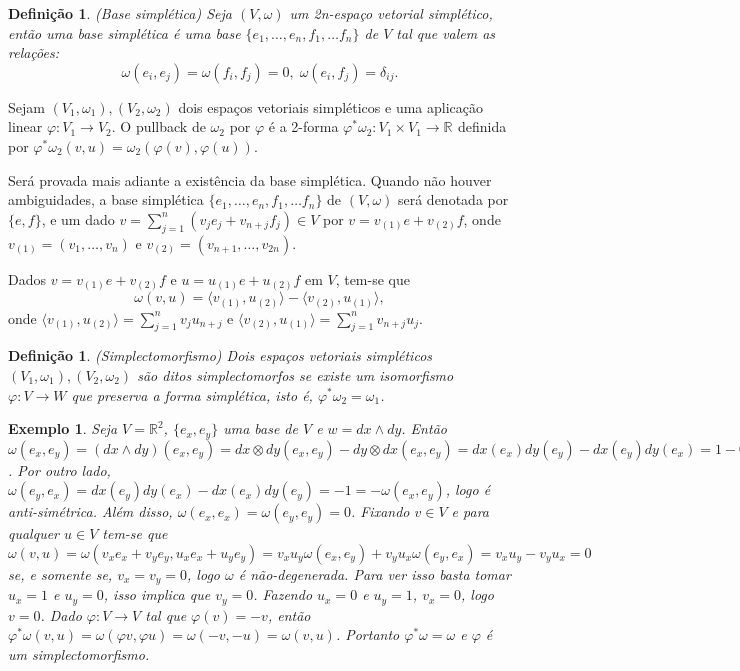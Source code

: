 \documentclass[12pt]{book}
\newtheorem{definicao}[teorema]{Definição}
\newtheorem{exemplo}[teorema]{Exemplo}
\newcommand{\formaSimpletica}[2]{\omega(#1, #2)}
\newcommand{\produtointerno}[2]{\langle #1, #2 \rangle}
\newcommand{\real}[1]{\mathbb{R}^{#1}}
\newcommand{\reta}{\real{}}
\begin{document}
	\begin{definicao}
		(Base simplética) Seja $(V, \omega)$ um 2n-espaço vetorial simplético, então uma base simplética é uma base $\{ e_{1},\dots, e_{n},f_{1},\dots f_{n}\}$ de $V$ tal que valem as relações:
		$$
		\omega(e_{i}, e_{j}) = \omega(f_{i}, f_{j}) = 0, \; \omega(e_{i}, f_{j}) = \delta_{ij}.
		$$
	\end{definicao}
	
	Sejam $(V_{1}, \omega_{1}), (V_{2}, \omega_{2})$ dois espaços vetoriais simpléticos e uma aplicação linear $\varphi: V_{1}\to V_{2}$. O pullback de $\omega_{2}$ por $\varphi$ é a 2-forma $\varphi^{*}\omega_{2}:V_{1} \times V_{1} \to \reta$ definida por $\varphi^{*}\omega_{2}(v,u) = \omega_{2}(\varphi(v), \varphi(u))$.
	
	Será provada mais adiante a existência da base simplética. \label{convensao_base_simpletica} Quando não houver ambiguidades, a base simplética  $\{ e_{1},\dots, e_{n},f_{1},\dots f_{n}\}$  de $(V, \omega)$ será denotada por  $\{ e ,f\}$, e um dado $v =\sum_{j=1}^{n}( v_{j}e_{j} +v_{n+j}f_{j}) \in V$ por $v=v_{(1)}e+v_{(2)}f$, onde $v_{(1)}=(v_{1}, \dots, v_{n})$ e $v_{(2)}=(v_{n+1}, \dots, v_{2n})$.


	Dados $v=v_{(1)}e+v_{(2)}f$ e $u=u_{(1)}e+u_{(2)}f$ em $V$, tem-se que 
	$$
		\formaSimpletica{v}{u} = \produtointerno{v_{(1)}}{u_{(2)}}-\produtointerno{v_{(2)}}{u_{(1)}}, 
	$$
	onde $\produtointerno{v_{(1)}}{u_{(2)}}=\sum_{j=1}^{n}v_{j}u_{n+j}$ e  $\produtointerno{v_{(2)}}{u_{(1)}}=\sum_{j=1}^{n}v_{n+j}u_{j}$.
	
	\begin{definicao}
		(Simplectomorfismo) Dois espaços vetoriais simpléticos $(V_{1}, \omega_{1}), (V_{2}, \omega_{2})$ são ditos simplectomorfos se existe um isomorfismo $\varphi:V\to W$ que preserva a forma simplética, isto é, $\varphi^{*}\omega_{2} = \omega_{1}$.
	\end{definicao}
	\begin{exemplo}\label{exemplo_espaco_simpletico_real}
		Seja $V = \real{2}$, $\{e_{x}, e_{y}\}$ uma base de $V$ e $w=dx \wedge dy$. Então $\omega(e_{x}, e_{y}) = (dx \wedge dy)(e_{x}, e_{y}) = dx\otimes dy(e_{x}, e_{y})-dy\otimes dx(e_{x}, e_{y}) =dx(e_{x}) dy(e_{y}) - dx(e_{y}) dy(e_{x}) = 1-0= 1$. Por outro lado, $\omega(e_{y}, e_{x}) =dx(e_{y}) dy(e_{x}) - dx(e_{x}) dy(e_{y}) =-1 =-\omega(e_{x}, e_{y})$, logo é anti-simétrica. Além disso, $\omega(e_{x}, e_{x}) = \omega(e_{y}, e_{y}) = 0$. Fixando $v \in V$ e para qualquer $u \in V$ tem-se que $\omega(v, u) = \omega(v_{x}e_{x}+v_{y}e_{y}, u_{x}e_{x}+u_{y}e_{y}) = v_{x}u_{y}\omega(e_{x}, e_{y}) +v_{y}u_{x}\omega(e_{y}, e_{x}) = v_{x}u_{y} -v_{y}u_{x} = 0$ se, e somente se, $v_{x}=v_{y}=0$, logo $\omega$ é não-degenerada. Para ver isso basta tomar $u_{x} = 1$ e $u_{y} = 0$, isso implica que $v_{y} = 0$. Fazendo $u_{x} = 0$ e $u_{y} = 1$, $v_{x} = 0$, logo $v=0$. Dado $\varphi:V \to V$ tal que $\varphi(v) = -v$, então $\varphi^{*}\omega(v, u) = \omega(\varphi v, \varphi u)=\omega(-v, -u)=\omega(v, u)$. Portanto $\varphi^{*}\omega = \omega$ e $\varphi$ é um simplectomorfismo.
	\end{exemplo}
	
\end{document}
